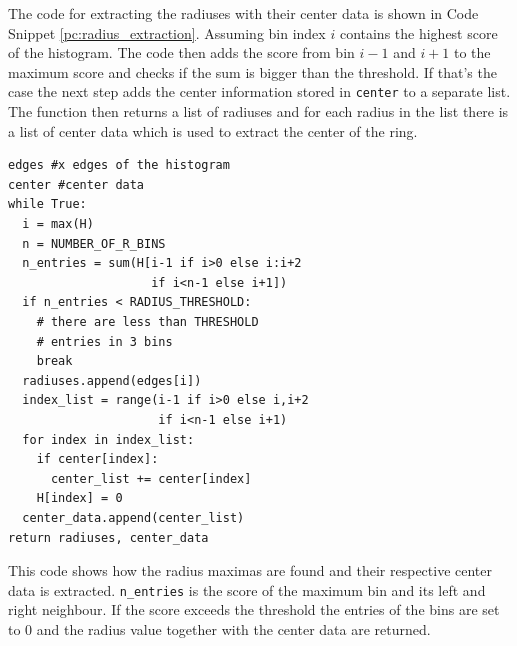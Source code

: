 \documentclass[11pt]{scrreprt}
\begin{document}
The code for extracting the radiuses with their center data is shown in Code Snippet \ref{pc:radius_extraction}. Assuming bin index $i$ 
contains the highest score of the histogram. The code then adds the score from bin $i-1$ and $i+1$ to the maximum score and checks if 
the sum is bigger than the threshold. If that's the case the next step adds the center information stored in \texttt{center} to a separate
list. The function then returns a list of radiuses and for each radius in the list there is a list of center data which is used to 
extract the center of the ring.
\begin{codesnippet}
  \begin{lstlisting}
edges #x edges of the histogram
center #center data
while True:
  i = max(H)
  n = NUMBER_OF_R_BINS 
  n_entries = sum(H[i-1 if i>0 else i:i+2 
                    if i<n-1 else i+1])
  if n_entries < RADIUS_THRESHOLD:
    # there are less than THRESHOLD
    # entries in 3 bins
    break
  radiuses.append(edges[i])
  index_list = range(i-1 if i>0 else i,i+2 
                     if i<n-1 else i+1)
  for index in index_list:
    if center[index]:
      center_list += center[index]
    H[index] = 0
  center_data.append(center_list)    
return radiuses, center_data 
\end{lstlisting}
\caption[Radius extraction algorithm]{This code shows how the radius maximas are found and their respective center data is extracted.
\texttt{n\_entries} is the score of the maximum bin and its left and right neighbour. If the score exceeds the threshold the entries of the
bins are set to 0 and the radius value together with the center data are returned.}\label{pc:radius_extraction}
\end{codesnippet}
\end{document}
